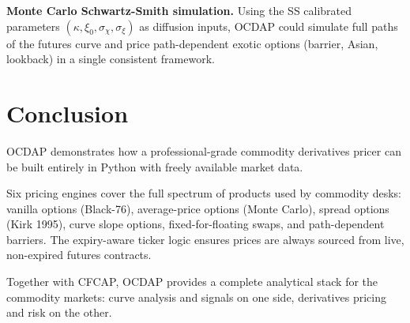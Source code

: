 \documentclass[11pt,a4paper]{article}
\begin{document}
\textbf{Monte Carlo Schwartz-Smith simulation.}
Using the SS calibrated parameters $(\kappa, \xi_0, \sigma_\chi, \sigma_\xi)$ as
diffusion inputs, OCDAP could simulate full paths of the futures curve and price
path-dependent exotic options (barrier, Asian, lookback) in a single consistent framework.

\section{Conclusion}

OCDAP demonstrates how a professional-grade commodity derivatives pricer can
be built entirely in Python with freely available market data.

Six pricing engines cover the full spectrum of products used by commodity desks:
vanilla options (Black-76), average-price options (Monte Carlo), spread options
(Kirk 1995), curve slope options, fixed-for-floating swaps, and path-dependent
barriers. The expiry-aware ticker logic ensures prices are always sourced from
live, non-expired futures contracts.

Together with CFCAP, OCDAP provides a complete analytical stack for the
commodity markets: curve analysis and signals on one side, derivatives pricing
and risk on the other.
\end{document}
